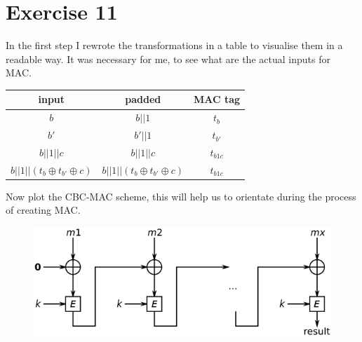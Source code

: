 \documentclass[a4paper,10pt]{article}
\begin{document}
\section*{Exercise 11}
In the first step I rewrote the transformations in a table to visualise them in a readable way. It was necessary for me, to see what are the actual inputs for MAC.

\begin{table}[h!]
\centering
\begin{tabular}{|c|c|c|}
\hline 
input & padded &MAC tag \\ 
\hline 
$b$ & $b||1$ & $t_b$ \\ 
\hline 
$b' $& $b'||1 $& $t_{b'} $\\ 
\hline 
$b||1||c$ & $b||1||c $& $t_{b1c}$ \\ 
\hline 
$b||1||(t_b \oplus t_{b'} \oplus c)$ & $b||1||(t_b \oplus t_{b'} \oplus c)$ & $t_{b1c}$ \\ 
\hline
\end{tabular} 
\end{table}

Now plot the CBC-MAC scheme, this will help us to orientate during the process of creating MAC.
\begin{figure}[h!]
\centering
\includegraphics[scale=0.5]{CBC-MAC.png}
\end{figure}
\end{document}
